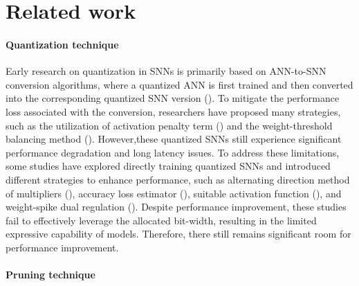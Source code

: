 \section{Related work}
\paragraph{Quantization technique}
Early research on quantization in SNNs is primarily based on ANN-to-SNN conversion algorithms, where a quantized ANN is first trained and then converted into the corresponding quantized SNN version (\cite{sorbaro2020optimizing,roy2019scaling}).
To mitigate the performance loss associated with the conversion, researchers have proposed many strategies, such as the utilization of activation penalty term (\cite{sorbaro2020optimizing}) and the weight-threshold balancing method (\cite{wang2020deep}). 
However,these quantized SNNs still experience significant performance degradation and long latency issues.
To address these limitations, some studies have explored directly training quantized SNNs and introduced different strategies to enhance performance, such as alternating direction method of multipliers (\cite{deng2021comprehensive}), accuracy loss estimator (\cite{pei2023albsnn}), suitable activation function (\cite{hu2024bitsnns}), and weight-spike dual regulation (\cite{wei2024q,wang2024ternary}).
Despite performance improvement, these studies fail to effectively leverage the allocated bit-width, resulting in the limited expressive capability of models. 
Therefore, there still remains significant room for performance improvement.



\paragraph{Pruning technique}

